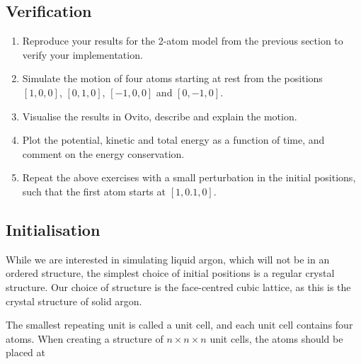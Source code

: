 \documentclass[11pt,british,a4paper]{report}
\begin{document}
\subsection{Verification}
\begin{enumerate}[label=\roman*.]
     \item Reproduce your results for the 2-atom model from the previous section to verify your implementation.
    \item Simulate the motion of four atoms starting at rest from the positions \([1,0,0]\), \([0,1,0]\), \([-1,0,0]\) and \([0,-1,0]\).
    \item Visualise the results in Ovito, describe and explain the motion.
    \item Plot the potential, kinetic and total energy as a function of time, and comment on the energy conservation.
    \item Repeat the above exercises with a small perturbation in the initial positions, such that the first atom starts at \([1,0.1,0]\).
\end{enumerate}

\subsection{Initialisation}
While we are interested in simulating liquid argon, which will not be in an ordered structure, the simplest choice of initial positions is a regular crystal structure. Our choice of structure is the face-centred cubic lattice, as this is the crystal structure of solid argon.

The smallest repeating unit is called a unit cell, and each unit cell contains four atoms. When creating a structure of \(n\times n\times n\) unit cells, the atoms should be placed at
\end{document}
